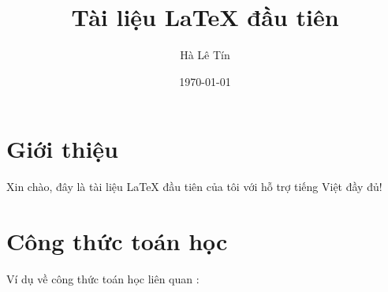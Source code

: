\documentclass[12pt]{article}
\title{Tài liệu LaTeX đầu tiên}
\author{Hà Lê Tín}
\date{\today}
\begin{document}
\maketitle

\section{Giới thiệu}

Xin chào, đây là tài liệu \LaTeX{} đầu tiên của tôi với hỗ trợ tiếng Việt đầy đủ!

\section{Công thức toán học}

Ví dụ về công thức toán học liên quan :
\end{document}

